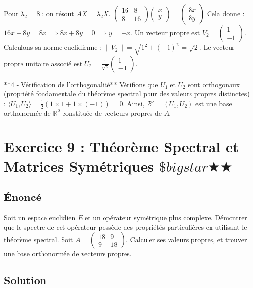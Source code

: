 \documentclass[11pt,a4paper]{article}
\begin{document}
Pour $\lambda_2 = 8$ : on résout $AX = \lambda_2 X$.
$\begin{pmatrix} 16 & 8 \\ 8 & 16 \end{pmatrix} \begin{pmatrix} x \\ y \end{pmatrix} = \begin{pmatrix} 8x \\ 8y \end{pmatrix}$
Cela donne :
$16x + 8y = 8x \implies 8x + 8y = 0 \implies y = -x$.
Un vecteur propre est $V_2 = \begin{pmatrix} 1 \\ -1 \end{pmatrix}$.
Calculons sa norme euclidienne : $\|V_2\| = \sqrt{1^2 + (-1)^2} = \sqrt{2}$.
Le vecteur propre unitaire associé est $U_2 = \frac{1}{\sqrt{2}} \begin{pmatrix} 1 \\ -1 \end{pmatrix}$.

**4 - Vérification de l'orthogonalité**
Vérifions que $U_1$ et $U_2$ sont orthogonaux (propriété fondamentale du théorème spectral pour des valeurs propres distinctes) :
$\langle U_1, U_2 \rangle = \frac{1}{2} (1 \times 1 + 1 \times (-1)) = 0$.
Ainsi, $\mathcal{B}' = (U_1, U_2)$ est une base orthonormée de $\mathbb{R}^2$ constituée de vecteurs propres de $A$.

\newpage
\section{Exercice 9 : Théorème Spectral et Matrices Symétriques \quad $\$bigstar$\bigstar$\bigstar$\bigstar$\bigstar$}

\subsection{Énoncé}
Soit un espace euclidien $E$ et un opérateur symétrique plus complexe.
Démontrer que le spectre de cet opérateur possède des propriétés particulières en utilisant le théorème spectral.
Soit $A = \begin{pmatrix} 18 & 9 \\ 9 & 18 \end{pmatrix}$.
Calculer ses valeurs propres, et trouver une base orthonormée de vecteurs propres.

\subsection{Solution}
\end{document}

